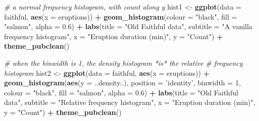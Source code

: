 \documentclass[english,10pt,a4paper,oneside]{book}
\newenvironment{Shaded}{\begin{snugshade}}{\end{snugshade}}
\newcommand{\KeywordTok}[1]{\textcolor[rgb]{0.13,0.29,0.53}{\textbf{#1}}}
\newcommand{\DataTypeTok}[1]{\textcolor[rgb]{0.13,0.29,0.53}{#1}}
\newcommand{\DecValTok}[1]{\textcolor[rgb]{0.00,0.00,0.81}{#1}}
\newcommand{\FloatTok}[1]{\textcolor[rgb]{0.00,0.00,0.81}{#1}}
\newcommand{\StringTok}[1]{\textcolor[rgb]{0.31,0.60,0.02}{#1}}
\newcommand{\CommentTok}[1]{\textcolor[rgb]{0.56,0.35,0.01}{\textit{#1}}}
\newcommand{\OperatorTok}[1]{\textcolor[rgb]{0.81,0.36,0.00}{\textbf{#1}}}
\newcommand{\NormalTok}[1]{#1}
\theoremstyle{definition}
\theoremstyle{definition}
\theoremstyle{definition}
\theoremstyle{remark}
\begin{document}
\begin{Shaded}
\begin{Highlighting}[]
\CommentTok{# a normal frequency histogram, with count along y}
\NormalTok{hist1 <-}\StringTok{ }\KeywordTok{ggplot}\NormalTok{(}\DataTypeTok{data =}\NormalTok{ faithful, }\KeywordTok{aes}\NormalTok{(}\DataTypeTok{x =}\NormalTok{ eruptions)) }\OperatorTok{+}
\StringTok{  }\KeywordTok{geom_histogram}\NormalTok{(}\DataTypeTok{colour =} \StringTok{"black"}\NormalTok{, }\DataTypeTok{fill =} \StringTok{"salmon"}\NormalTok{, }\DataTypeTok{alpha =} \FloatTok{0.6}\NormalTok{) }\OperatorTok{+}
\StringTok{  }\KeywordTok{labs}\NormalTok{(}\DataTypeTok{title =} \StringTok{"Old Faithful data"}\NormalTok{,}
       \DataTypeTok{subtitle =} \StringTok{"A vanilla frequency histogram"}\NormalTok{,}
       \DataTypeTok{x =} \StringTok{"Eruption duration (min)"}\NormalTok{,}
       \DataTypeTok{y =} \StringTok{"Count"}\NormalTok{) }\OperatorTok{+}\StringTok{ }\KeywordTok{theme_pubclean}\NormalTok{()}

\CommentTok{# when the binwidth is 1, the density histogram *is* the relative}
\CommentTok{# frequency histogram}
\NormalTok{hist2 <-}\StringTok{ }\KeywordTok{ggplot}\NormalTok{(}\DataTypeTok{data =}\NormalTok{ faithful, }\KeywordTok{aes}\NormalTok{(}\DataTypeTok{x =}\NormalTok{ eruptions)) }\OperatorTok{+}
\StringTok{  }\KeywordTok{geom_histogram}\NormalTok{(}\KeywordTok{aes}\NormalTok{(}\DataTypeTok{y =}\NormalTok{ ..density..),}
                 \DataTypeTok{position =} \StringTok{'identity'}\NormalTok{, }\DataTypeTok{binwidth =} \DecValTok{1}\NormalTok{,}
                 \DataTypeTok{colour =} \StringTok{"black"}\NormalTok{, }\DataTypeTok{fill =} \StringTok{"salmon"}\NormalTok{, }\DataTypeTok{alpha =} \FloatTok{0.6}\NormalTok{) }\OperatorTok{+}
\StringTok{  }\KeywordTok{labs}\NormalTok{(}\DataTypeTok{title =} \StringTok{"Old Faithful data"}\NormalTok{,}
       \DataTypeTok{subtitle =} \StringTok{"Relative frequency histogram"}\NormalTok{,}
       \DataTypeTok{x =} \StringTok{"Eruption duration (min)"}\NormalTok{,}
       \DataTypeTok{y =} \StringTok{"Count"}\NormalTok{) }\OperatorTok{+}\StringTok{ }\KeywordTok{theme_pubclean}\NormalTok{()}



\end{Highlighting}
\end{Shaded}
\end{document}
